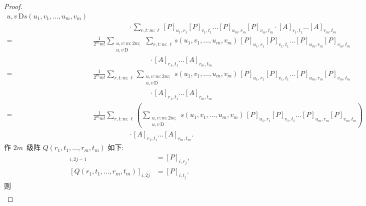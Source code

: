 \documentclass[../libro]{subfiles}
\begin{document}
\begin{proof}
\begin{align*}
{{                u, v \,\text{D}
            }}
        s(u_1, v_1, \dots, u_m, v_m)     \\
             &
        \quad \quad \quad \quad \quad
        {} \cdot
        \sum_{r, t \text{:}\, m \text{:}\, \ell}
        [P]_{u_1,r_1} [P]_{v_1,t_1} \dots [P]_{u_m,r_m} [P]_{v_m,t_m}
        \cdot [A]_{r_1,t_1} \dots [A]_{r_m,t_m}
        \\
        = {} &
        \frac{1}{2^m m!}
        \sum_{\substack{
        u, v \text{:}\, m \text{:}\, 2m; \\
                u, v \,\text{D}
            }}
        \sum_{r, t \text{:}\, m \text{:}\, \ell}
        s(u_1, v_1, \dots, u_m, v_m)
        \,
        [P]_{u_1,r_1} [P]_{v_1,t_1} \dots [P]_{u_m,r_m} [P]_{v_m,t_m}
        \\
             &
        \quad \quad \quad \quad
        \quad \quad \quad \quad
        {} \cdot [A]_{r_1,t_1} \dots [A]_{r_m,t_m}
        \\
        = {} &
        \frac{1}{2^m m!}
        \sum_{r, t \text{:}\, m \text{:}\, \ell}
        \sum_{\substack{
        u, v \text{:}\, m \text{:}\, 2m; \\
                u, v \,\text{D}
            }}
        s(u_1, v_1, \dots, u_m, v_m)
        \,
        [P]_{u_1,r_1} [P]_{v_1,t_1} \dots [P]_{u_m,r_m} [P]_{v_m,t_m}
        \\
             &
        \quad \quad \quad \quad
        \quad \quad \quad \quad
        {} \cdot [A]_{r_1,t_1} \dots [A]_{r_m,t_m}
        \\
        = {} &
        \frac{1}{2^m m!}
        \sum_{r, t \text{:}\, m \text{:}\, \ell}
        \left(
        \sum_{\substack{
        u, v \text{:}\, m \text{:}\, 2m; \\
                u, v \,\text{D}
            }}
        s(u_1, v_1, \dots, u_m, v_m)
        \,
        [P]_{u_1,r_1} [P]_{v_1,t_1} \dots [P]_{u_m,r_m} [P]_{v_m,t_m}
        \right)
        \\
             &
        \quad \quad \quad \quad \quad
        {} \cdot [A]_{r_1,t_1} \dots [A]_{r_m,t_m}.
    \end{align*}
    作 \(2m\)~级阵 \(Q(r_1, t_1, \dots, r_m, t_m)\) 如下:
    \begin{align*}
        [Q(r_1, t_1, \dots, r_m, t_m)]_{i,2j-1} & = [P]_{i,r_j}, \\
        [Q(r_1, t_1, \dots, r_m, t_m)]_{i,2j}   & = [P]_{i,t_j}.
    \end{align*}
    则
    \begin{align*}

\end{align*}
\end{proof}
\end{document}

